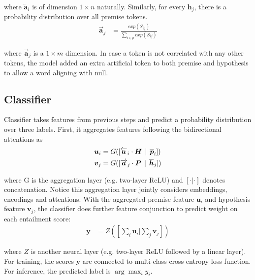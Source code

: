 \documentclass[review,journal]{vgtc}         %
\begin{document}
where $\overleftarrow{\boldsymbol{a}}_i$ is of dimension $1 \times n$ naturally. Similarly, for every $\boldsymbol{h}_j$, there is a probability distribution over all premise tokens.
\begin{align}
  \overrightarrow{\boldsymbol{a}}_j &= \frac{exp(S_{ij})}{\sum_{i \in p} exp(S_{ij})} \label{eq:aright}
\end{align}

where $\overrightarrow{\boldsymbol{a}}_j$ is a $1 \times m$ dimension. In case a token is not correlated with any other tokens, the model added an extra artificial token to both premise and hypothesis to allow a word aligning with null.

\subsection{Classifier} \label{sec:cls}
Classifier takes features from previous steps and predict a probability distribution over three labels. First, it aggregates features following the bidirectional attentions as
\begin{align}
  \boldsymbol{u}_i &= G([\overleftarrow{\boldsymbol{a}}_i \cdot \boldsymbol{H} \hspace{1ex} | \hspace{1ex}  \overline{\boldsymbol{p}}_i]) \\
  \boldsymbol{v}_j &= G([\overrightarrow{\boldsymbol{a}}_j \cdot \boldsymbol{P} \hspace{1ex}  | \hspace{1ex}  \overline{\boldsymbol{h}}_j])
\end{align}

where G is the aggregation layer (e.g. two-layer ReLU) and $[\cdot|\cdot]$ denotes concatenation. Notice this aggregation layer jointly considers embeddings, encodings and attentions. With the aggregated premise feature $\boldsymbol{u}_i$ and hypothesis feature $\boldsymbol{v}_j$, the classifier does further feature conjunction to predict weight on each entailment score:
\begin{align}
  \boldsymbol{y} &= Z([\sum_i \boldsymbol{u}_i | \sum_j \boldsymbol{v}_j]) \label{eq:yscore}
\end{align}

where $Z$ is another neural layer (e.g. two-layer ReLU followed by a linear layer). For training, the scores $\boldsymbol{y}$ are connected to multi-class cross entropy loss function. For inference, the predicted label is $\arg\max_i y_i$.
\end{document}
